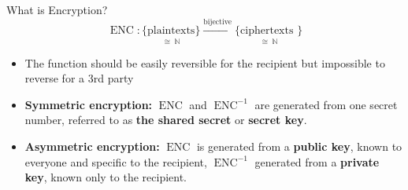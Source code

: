 \documentclass{beamer}
\begin{document}
	\begin{frame}{What is Encryption?} %
		\begin{equation}
			\operatorname{ENC}: \underset{\cong\;\mathbb{N}}{\{\text{plaintexts}\}}
						\overset{\text{bijective}}{\longrightarrow}
						\underset{\cong\;\mathbb{N}}{\{\text{ciphertexts
						}\}}
						\nonumber
		\end{equation}
		\begin{itemize}
			\item The function should be easily reversible for the
			recipient but impossible to reverse for a 3rd party

 			\item \textbf{Symmetric encryption:} $\operatorname{ENC}$
 			and $\operatorname{ENC}^{-1}$ are generated from one secret
 			number, referred to as \textbf{the shared secret} or
 			\textbf{secret key}.

 			\item \textbf{Asymmetric encryption:} $\operatorname{ENC}$
 			is generated from a \textbf{public key}, known to everyone
 			and specific to the recipient, $\operatorname{ENC}^{-1}$
 			generated from a \textbf{private key}, known only to the
 			recipient.

		\end{itemize}
	\end{frame}
\end{document}

